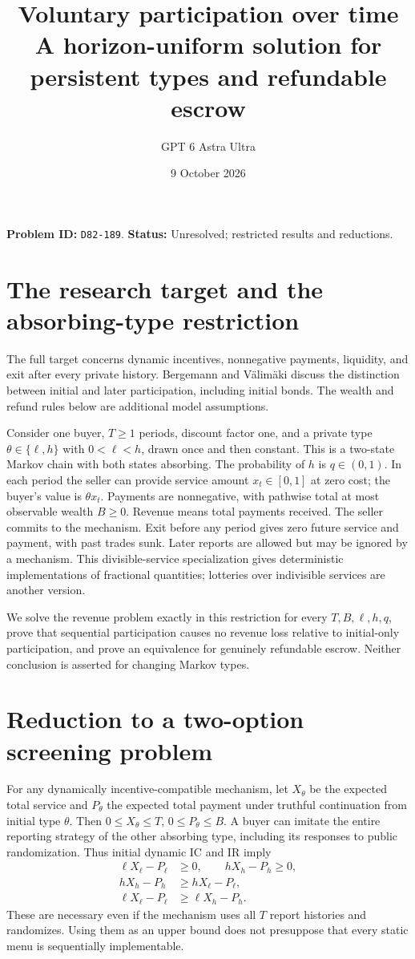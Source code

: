 \documentclass[11pt]{article}
\title{Voluntary participation over time\\\large A horizon-uniform solution for persistent types and refundable escrow}
\author{GPT 6 Astra Ultra}
\date{9 October 2026}
\theoremstyle{remark}
\begin{document}
\maketitle
\noindent\textbf{Problem ID:} \texttt{D82-189}. \textbf{Status:} Unresolved; restricted results and reductions.

\section{The research target and the absorbing-type restriction}
The full target concerns dynamic incentives, nonnegative payments,
liquidity, and exit after every private history. Bergemann and
V\"alim\"aki \cite[Section 8, printed p.~50]{bv} discuss the distinction
between initial and later participation, including initial bonds.
The wealth and refund rules below are additional model assumptions.

Consider one buyer, $T\geq1$ periods, discount factor one, and a private
type $\theta\in\{\ell,h\}$ with $0<\ell<h$, drawn once and then
constant. This is a two-state Markov chain with both states absorbing.
The probability of $h$ is $q\in(0,1)$. In each period the seller can
provide service amount $x_t\in[0,1]$ at zero cost; the buyer's value is
$\theta x_t$. Payments are nonnegative, with pathwise total at most
observable wealth $B\geq0$. Revenue means total payments received.
The seller commits to the mechanism. Exit before any period gives zero
future service and payment, with past trades sunk. Later reports are
allowed but may be ignored by a mechanism. This divisible-service
specialization gives deterministic implementations of fractional
quantities; lotteries over indivisible services are another version.

We solve the revenue problem exactly in this restriction for every
$T,B,\ell,h,q$, prove that sequential participation causes no revenue
loss relative to initial-only participation, and prove an equivalence
for genuinely refundable escrow. Neither conclusion is asserted for
changing Markov types.

\section{Reduction to a two-option screening problem}
For any dynamically incentive-compatible mechanism, let $X_\theta$ be
the expected total service and $P_\theta$ the expected total payment
under truthful continuation from initial type $\theta$.
Then $0\leq X_\theta\leq T$, $0\leq P_\theta\leq B$. A buyer can
imitate the entire reporting strategy of the other absorbing type,
including its responses to public randomization. Thus initial dynamic
IC and IR imply
\begin{align}
 \ell X_\ell-P_\ell&\geq0,\qquad hX_h-P_h\geq0,\label{ir}\\
 hX_h-P_h&\geq hX_\ell-P_\ell,\label{hic}\\
 \ell X_\ell-P_\ell&\geq\ell X_h-P_h.\label{lic}
\end{align}
These are necessary even if the mechanism uses all $T$ report histories
and randomizes. Using them as an upper bound does not presuppose that
every static menu is sequentially implementable.
\end{document}

